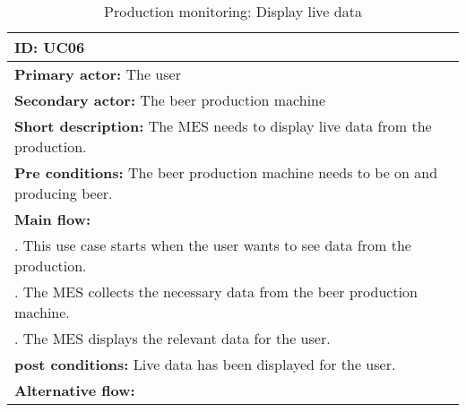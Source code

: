 \begin{table}[ht]
    \begin{tabularx}{\textwidth}{|>{\RaggedRight}X|}
        \hline
        \textbf{ID:} UC06  \\
        \hline
        \textbf{Primary actor:} The user \\
        \hline
        \textbf{Secondary actor:} The beer production machine \\
        \hline
        \textbf{Short description:} The MES needs to display live data from the
        production. \\
        \hline
        \textbf{Pre conditions:} The beer production machine needs to be on and
        producing beer. \\
        \hline
        \textbf{Main flow:} \\
        	1. This use case starts when the user wants to see data from the
        	production. \\
			2. The MES collects the necessary data from the beer production
			machine. \\
			3. The MES displays the relevant data for the user. \\
		\hline
        \textbf{post conditions:} Live data has been displayed for the user. \\
        \hline
        \textbf{Alternative flow:} \\
        \hline
    \end{tabularx}
    \caption{Production monitoring: Display live data}
    \label{table:usecase_displayLiveData}
\end{table}

